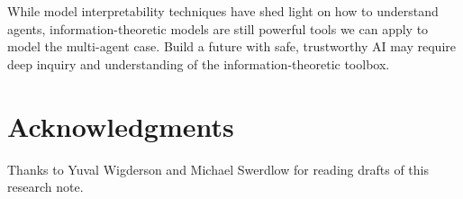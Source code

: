 \documentclass[11pt]{article}
\begin{document}
While model interpretability techniques \cite{hohman2018visual}\cite{koh2017understanding}\cite{olah2017feature} have shed light on how to understand agents, information-theoretic models are still powerful tools we can apply to model the multi-agent case.  Build a future with safe, trustworthy AI may require deep inquiry and understanding of the information-theoretic toolbox.

\newpage

\section*{Acknowledgments}

Thanks to Yuval Wigderson and Michael Swerdlow for reading drafts of this research note.


\nocite{*}

\end{document}
